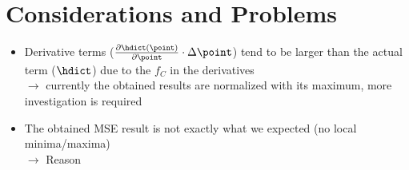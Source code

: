\documentclass{article}
\begin{document}
\section{Considerations and Problems}
\begin{itemize}
\item Derivative terms ($\frac{\partial \hdict (\point)}{\partial \point} \cdot \Delta \point $) tend to be larger than the actual term ($\hdict$) due to the $f_C$ in the derivatives\\
$\rightarrow$ currently the obtained results are normalized with its maximum, more investigation is required\\
\item The obtained MSE result is not exactly what we expected (no local minima/maxima)\\
$\rightarrow$ Reason
\end{itemize}

%
 
\end{document}
